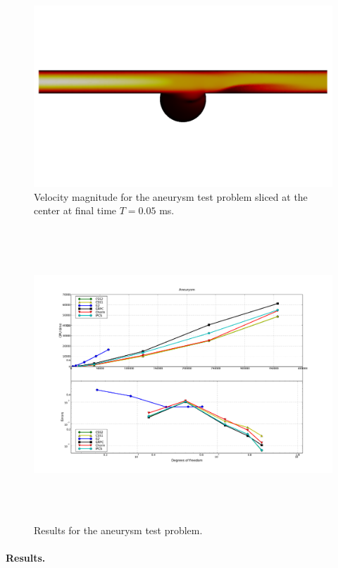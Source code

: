 \begin{figure}
  \includegraphics[width=\largefig]{chapters/kvs-1/pdf/aneurysm_at_end_css1.pdf}
  \caption{Velocity magnitude for the aneurysm test problem sliced at
  the center at final time $T = 0.05$ ms.}
  \label{fig:aneurysm}
\end{figure}

\begin{figure}
  \hspace{-2cm}
  \includegraphics[width=20cm,height=11cm,keepaspectratio=false]{chapters/kvs-1/pdf/new_aneurysm_res.pdf}
  \caption{Results for the aneurysm test problem.}
  \label{fig:aneurysm_res}
\end{figure}

\paragraph{Results.}

